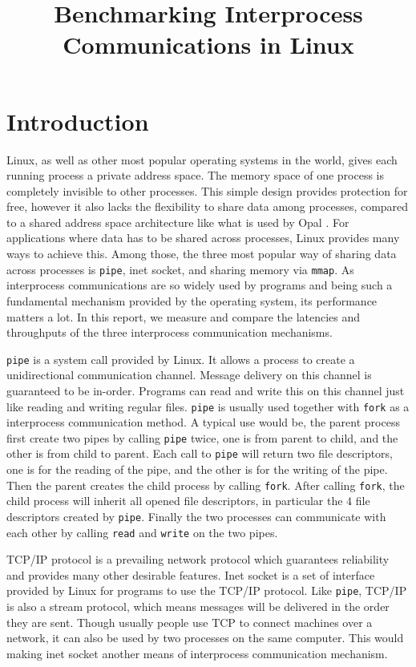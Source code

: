 \documentclass{article}
\title{Benchmarking Interprocess Communications in Linux}
\begin{document}
\maketitle

\section{Introduction}
Linux, as well as other most popular operating systems in the world, gives each running process a private address space.
The memory space of one process is completely invisible to other processes.
This simple design provides protection for free, however it also lacks the flexibility to share data among processes, compared to a shared address space architecture like what is used by Opal \cite{opal}.
For applications where data has to be shared across processes, Linux provides many ways to achieve this.
Among those, the three most popular way of sharing data across processes is \texttt{pipe}, inet socket, and sharing memory via \texttt{mmap}.
As interprocess communications are so widely used by programs and being such a fundamental mechanism provided by the operating system, its performance matters a lot.
In this report, we measure and compare the latencies and throughputs of the three interprocess communication mechanisms.

\texttt{pipe} is a system call provided by Linux.
It allows a process to create a unidirectional communication channel.
Message delivery on this channel is guaranteed to be in-order.
Programs can read and write this on this channel just like reading and writing regular files.
\texttt{pipe} is usually used together with \texttt{fork} as a interprocess communication method.
A typical use would be, the parent process first create two pipes by calling \texttt{pipe} twice, one is from parent to child, and the other is from child to parent.
Each call to \texttt{pipe} will return two file descriptors, one is for the reading of the pipe, and the other is for the writing of the pipe.
Then the parent creates the child process by calling \texttt{fork}.
After calling \texttt{fork}, the child process will inherit all opened file descriptors, in particular the $4$ file descriptors created by \texttt{pipe}.
Finally the two processes can communicate with each other by calling \texttt{read} and \texttt{write} on the two pipes.

TCP/IP protocol is a prevailing network protocol which guarantees reliability and provides many other desirable features.
Inet socket is a set of interface provided by Linux for programs to use the TCP/IP protocol.
Like \texttt{pipe}, TCP/IP is also a stream protocol, which means messages will be delivered in the order they are sent.
Though usually people use TCP to connect machines over a network, it can also be used by two processes on the same computer.
This would making inet socket another means of interprocess communication mechanism.
\end{document}
